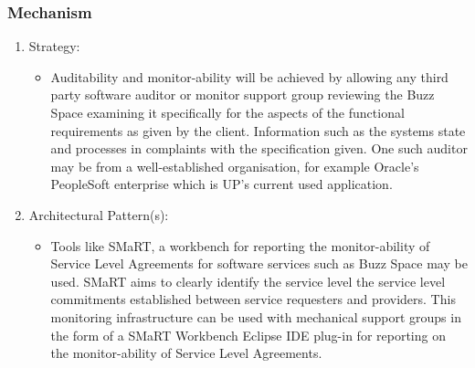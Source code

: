 	\subsubsection*{Mechanism}
		\begin{enumerate}
			\item Strategy:
			\begin{itemize}
			 \item Auditability and monitor-ability will be achieved by allowing any third party software auditor or monitor support group reviewing the Buzz Space examining it specifically for the aspects of the functional requirements as given by the client. Information such as the systems state and processes in complaints with the specification given. One such auditor may be from a well-established organisation, for example Oracle’s PeopleSoft enterprise which is UP’s current used application.
			 \end{itemize}
			
			
			 \item Architectural Pattern(s):
			 \begin{itemize}
			 \item Tools like SMaRT, a workbench for reporting the monitor-ability of Service Level Agreements for software services such as Buzz Space may be used. SMaRT aims to clearly identify the service level the service level commitments established between service requesters and providers. This monitoring infrastructure can be used with mechanical support groups in the form of a SMaRT Workbench Eclipse IDE plug-in for reporting on the monitor-ability of Service Level Agreements.
			 \end{itemize}
			 
		\end{enumerate}

